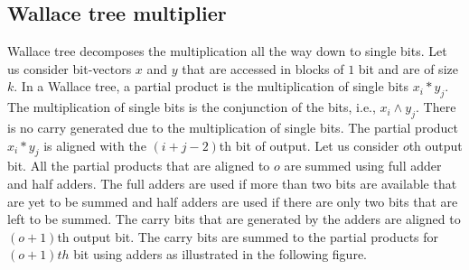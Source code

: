 \subsection{Wallace tree multiplier\cite{wallace}}
%
Wallace tree decomposes the multiplication all the way down to single bits.
%
Let us consider bit-vectors $x$ and $y$ that are accessed in  blocks of $1$
bit and are of size $k$.
%
In a Wallace tree, a partial product is the multiplication of single
bits $x_i*y_j$.
%
The multiplication of single bits is the conjunction of the bits, i.e.,
$x_i \land y_j$.
%
There is no carry generated due to the multiplication of single bits.
%
The partial product $x_i*y_j$ is aligned with the $(i+j-2)$th bit of output.
%
Let us consider $o$th output bit.
%
All the partial products that are aligned to $o$ are summed using full adder 
and half adders.
%
The full adders are used
if more than two bits are available that are yet to be summed
and half adders are used if there are only two bits that are left to be summed.
%
The carry bits that are generated by the adders are aligned to
$(o+1)$th output bit.
%
The carry bits are summed to the partial products for $(o+1)th$ bit
using adders as illustrated in the following figure.

\begin{center}
\end{center}

